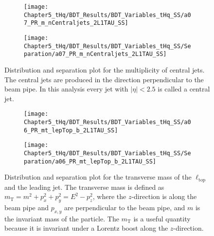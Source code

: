 \begin{figure}[h]
\centering
\begin{subfigure}{.45\textwidth}
  \centering
  \texttt{[image: Chapter5\_tHq/BDT\_Results/BDT\_Variables\_tHq\_SS/a07\_PR\_m\_nCentraljets\_2L1TAU\_SS]}
\end{subfigure}%
\begin{subfigure}{.55\textwidth}
  \centering
  \texttt{[image: Chapter5\_tHq/BDT\_Results/BDT\_Variables\_tHq\_SS/Separation/a07\_PR\_m\_nCentraljets\_2L1TAU\_SS]}
\end{subfigure}
\caption{Distribution and separation plot for the multiplicity of central jets.
The central jets are produced in the direction perpendicular to the beam pipe.
In this analysis every jet with $|\eta| < 2.5$ is called a central jet.}
\label{fig:Appendix:BDTVARS:tHqSS:a07_PR_m_nCentraljets}
\end{figure}


\begin{figure}[h]
\centering
\begin{subfigure}{.45\textwidth}
  \centering
  \texttt{[image: Chapter5\_tHq/BDT\_Results/BDT\_Variables\_tHq\_SS/a06\_PR\_mt\_lepTop\_b\_2L1TAU\_SS]}
\end{subfigure}%
\begin{subfigure}{.55\textwidth}
  \centering
  \texttt{[image: Chapter5\_tHq/BDT\_Results/BDT\_Variables\_tHq\_SS/Separation/a06\_PR\_mt\_lepTop\_b\_2L1TAU\_SS]}
\end{subfigure}
\caption{Distribution and separation plot for the transverse mass of the $\ell_{\text{top}}$ and the leading \btagged jet. 
The transverse mass is defined as $m_{\text{T}} = m^{2} + p_{x}^{2} + p_{y}^{2} = E^{2} - p_{z}^{2}$, where the $z$-direction 
is along the beam pipe and $p_{x, y}$ are perpendicular to the beam pipe, and $m$ is the invariant mass of the particle.
The $m_{\text{T}}$ is a useful quantity because it is invariant under a Lorentz boost along the $z$-direction.}
\label{fig:Appendix:BDTVARS:tHqSS:a06_PR_mt_lepTop_b}
\end{figure}


